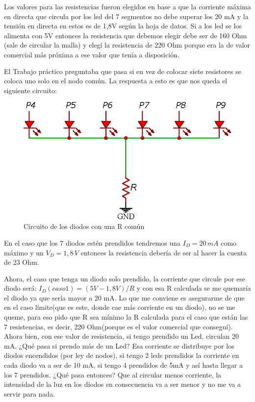 Los valores para las resistencias fueron elegidos en base a que la corriente máxima en directa que circula por los led del 7 segmentos no debe superar los 20 mA y la tensión en directa en estos es de 1,8V según la hoja de datos. Si a los led se los alimenta con 5V entonces la resistencia que debemos elegir debe ser de 160 Ohm (sale de circular la malla) y elegí la resistencia de 220 Ohm porque era la de valor comercial más próxima a ese valor que tenía a disposición.

El Trabajo práctico preguntaba que pasa si en vez de colocar siete resistores se coloca uno solo en el nodo común. La respuesta a esto es que nos queda el siguiente circuito:

\begin{figure}[H]
    \centering
    \includegraphics[width=.5\linewidth]{imagenes/DIODOS.eps}
    \caption{Circuito de los diodos con una R común}
    \label{fig:diodos}
\end{figure}



En el caso que los 7 diodos estén prendidos tendremos una $I_D=20\,mA$ como máximo y un $V_D=1,8\,V$ entonces la resistencia debería de ser al hacer la cuenta de 23 Ohm.

Ahora, el caso que tenga un diodo solo prendido, la corriente que circule por ese diodo será: 
$I_D(caso 1)=(5V-1,8V)/R$ y con esa R calculada se me quemaría el diodo ya que sería mayor a 20 mA. Lo que me conviene es asegurarme de que en el caso límite(que es este, donde cae más corriente en un diodo), no se me queme, para eso pido que R sea mínimo la R calculada para el caso que están las 7 resistencias, es decir, 220 Ohm(porque es el valor comercial que conseguí).
Ahora bien, con ese valor de resistencia, si tengo prendido un Led, circulan 20 mA, ¿Qué pasa si prendo más de un Led? Esa corriente se distribuye por los diodos encendidos (por ley de nodos), si tengo 2 leds prendidos la corriente en cada diodo va a ser de 10 mA, si tengo 4 prendidos de 5mA y así hasta llegar a los 7 prendidos. 
¿Qué pasa entonces? Que al circular menos corriente, la intensidad de la luz en los diodos en consecuencia va a ser menor y no me va a servir para nada.

